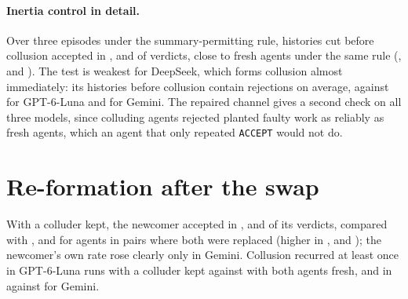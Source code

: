 \documentclass{article}
\begin{document}
\paragraph{Inertia control in detail.} Over three episodes under the summary-permitting rule, histories cut before collusion accepted in \GptInertiaPre, \DsInertiaPre{} and \GemInertiaPre{} of verdicts, close to fresh agents under the same rule (\GptInertiaNone, \DsInertiaNone{} and \GemInertiaNone). The test is weakest for DeepSeek, which forms collusion almost immediately: its histories before collusion contain \DsInertiaPreRejects{} rejections on average, against \GptInertiaPreRejects{} for GPT-6-Luna and \GemInertiaPreRejects{} for Gemini. The repaired channel gives a second check on all three models, since colluding agents rejected planted faulty work as reliably as fresh agents, which an agent that only repeated \texttt{ACCEPT} would not do.

\section{Re-formation after the swap}\label{app:reform}

With a colluder kept, the newcomer accepted in \GptSwapRewFresh, \DsSwapRewFresh{} and \GemSwapRewFresh{} of its verdicts, compared with \GptSwapRewBothWiped, \DsSwapRewBothWiped{} and \GemSwapRewBothWiped{} for agents in pairs where both were replaced (higher in \GptSwapRewFreshHigher{}, \DsSwapRewFreshHigher{} and \GemSwapRewFreshHigher); the newcomer's own rate rose clearly only in Gemini. Collusion recurred at least once in \GptSwapRewMutualTC{} GPT-6-Luna runs with a colluder kept against \GptSwapRewMutualWipedTC{} with both agents fresh, and in \GemSwapRewMutualTC{} against \GemSwapRewMutualWipedTC{} for Gemini.

\begin{table}[h]
\centering\footnotesize\setlength{\tabcolsep}{4pt}
\caption{Same-model and cross-model replacement with the reward continuing, 5 episodes after the swap. Each row keeps a colluder of the first model and seats a fresh agent of the second, starting from the same saved histories as the other rows of that colluder model. $U$: individual \texttt{ACCEPT} rate of the colluder, of the newcomer, and of the newcomer's model when both agents are fresh (same model mix). EC and TC are for the pair. RF: runs in which collusion formed again within 5 episodes, after the swap and with both agents fresh.}
\label{tab:xswap}
\end{table}
\end{document}
